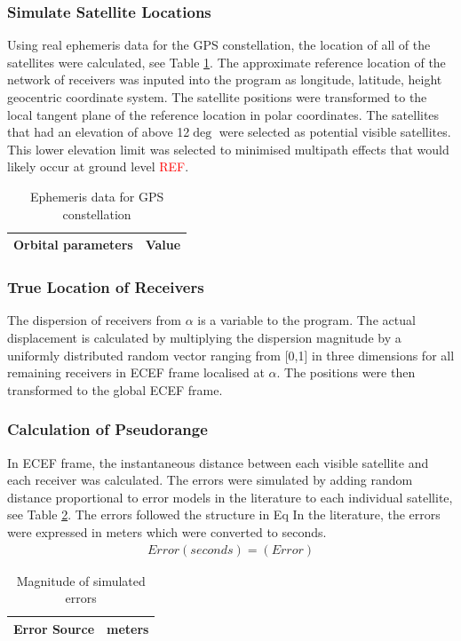 \documentclass[11pt,a4paper]{article}
\begin{document}
\subsubsection{Simulate Satellite Locations}
Using real ephemeris data for the GPS constellation, the location of all of the satellites were calculated, see Table \ref{Table: eph gps data}. The approximate reference location of the network of receivers was inputed into the program as longitude, latitude, height geocentric coordinate system. The satellite positions were transformed to the local tangent plane of the reference location in polar coordinates. The satellites that had an elevation of above 12$\deg$ were selected as potential visible satellites. This lower elevation limit was selected to minimised multipath effects that would likely occur at ground level \textcolor{red}{REF}. 
\begin{table}
\centering
\caption{Ephemeris data for GPS constellation}
\label{Table: eph gps data}
\begin{tabular}{|c|c|}
\hline
Orbital parameters & Value \\\hline
\end{tabular}
\end{table}

\subsubsection{True Location of Receivers}
The dispersion of receivers from $\alpha$ is a variable to the program. The actual displacement is calculated by multiplying the dispersion magnitude by a uniformly distributed random vector ranging from [0,1] in three dimensions for all remaining receivers in ECEF frame localised at $\alpha$. The positions were then transformed to the global ECEF frame.

\subsubsection{Calculation of Pseudorange}
In ECEF frame, the instantaneous distance between each visible satellite and each receiver was calculated. The errors were simulated by adding random distance proportional to error models in the literature to each individual satellite, see Table \ref{Table:mag errors}. The errors followed the structure in Eq
In the literature, the errors were expressed in meters which were converted to seconds.
\begin{eqnarray}
Error(seconds) = (Error)
\end{eqnarray}
\begin{table}
\centering
\caption{Magnitude of simulated errors}
\label{Table:mag errors}
\begin{tabular}{|c|c|}
\hline
Error Source & meters \\\hline
\end{tabular}
\end{table}
\end{document}
